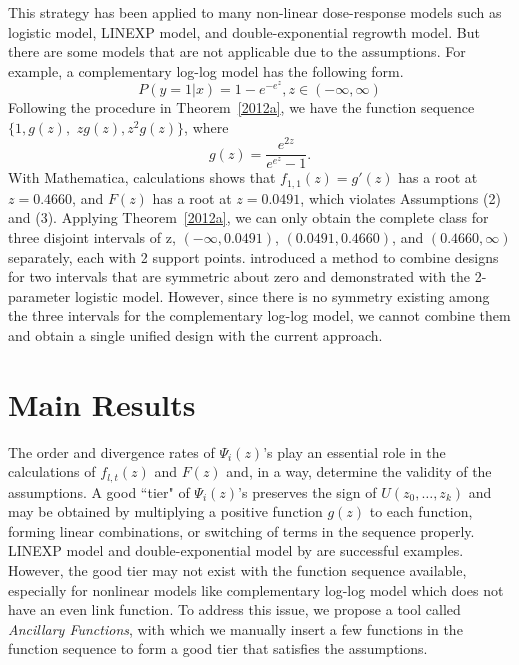 \documentclass[12pt]{amsart}
\theoremstyle{definition}
\theoremstyle{remark}
\numberwithin{equation}{section}
\begin{document}
 This strategy has been applied to many non-linear dose-response models such as logistic model, LINEXP model, and double-exponential regrowth model. But there are some models that are not applicable due to the assumptions. For example, a complementary log-log model has the following form. \[P(y=1|x) = 1-e^{-e^{z}}, z\in(-\infty,\infty)\] Following the procedure in Theorem~\ref{2012a}, we have the function sequence $\{1,g(z),$ $zg(z),z^2g(z)\}$, where \[g(z)=\frac{e^{2z}}{e^{e^z}-1}.\] 
 With Mathematica, calculations shows that $f_{1,1}(z) = g'(z)$ has a root at $z=0.4660$, and $F(z)$ has a root at $z=0.0491$, which violates Assumptions (2) and (3). Applying Theorem~\ref{2012a}, we can only obtain the complete class for three disjoint intervals of z, $(-\infty, 0.0491)$, $(0.0491, 0.4660)$, and $(0.4660,\infty)$ separately, each with 2 support points. \cite{yang2009} introduced a method to combine designs for two intervals that are symmetric about zero and demonstrated with the 2-parameter logistic model. However, since there is no symmetry existing among the three intervals for the complementary log-log model, we cannot combine them and obtain a single unified design with the current approach.

 
\section{Main Results}\label{main}
The order and divergence rates of $\Psi_i(z)$'s play an essential role in the calculations of $f_{l,t}(z)$ and $F(z)$ and, in a way, determine the validity of the assumptions. A good ``tier" of $\Psi_i(z)$'s preserves the sign of $U(z_0,\ldots,z_k)$ and may be obtained by multiplying a positive function $g(z)$ to each function, forming linear combinations, or switching of terms in the sequence properly. LINEXP model and double-exponential model by \cite{yang2012} are successful examples. However, the good tier may not exist with the function sequence available, especially for nonlinear models like complementary log-log model which does not have an even link function. To address this issue, we propose a tool called \textit{Ancillary Functions}, with which we manually insert a few functions in the function sequence to form a good tier that satisfies the assumptions. 
\end{document}

